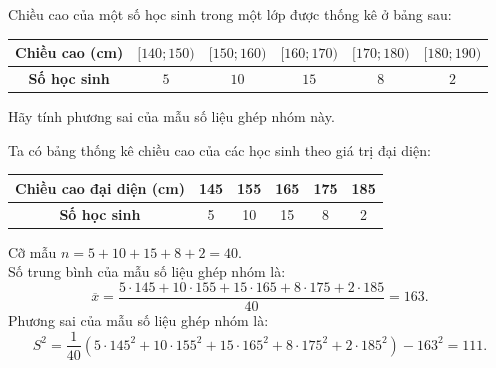 \begin{bt}[Mức độ 2]%
Chiều cao của một số học sinh trong một lớp được thống kê ở bảng sau:
\begin{center}
\begin{tabular}{|c|c|c|c|c|c|}
\hline
\textbf{Chiều cao (cm)} & $[140; 150)$ & $[150; 160)$ & $[160; 170)$ & $[170; 180)$ & $[180; 190)$ \\
\hline
\textbf{Số học sinh} & $5$ & $10$ & $15$ & $8$ & $2$ \\
\hline
\end{tabular}
\end{center}
Hãy tính phương sai của mẫu số liệu ghép nhóm này.
\loigiai
{
Ta có bảng thống kê chiều cao của các học sinh theo giá trị đại diện:
\begin{center}
\begin{tabular}{|c|c|c|c|c|c|}
\hline
\textbf{Chiều cao đại diện (cm)} & 145 & 155 & 165 & 175 & 185 \\
\hline
\textbf{Số học sinh} & 5 & 10 & 15 & 8 & 2 \\
\hline
\end{tabular}
\end{center}
Cỡ mẫu $n=5+10+15+8+2=40$.\\
Số trung bình của mẫu số liệu ghép nhóm là:
\[ \overline{x}=\dfrac{5\cdot 145+10\cdot155+15\cdot165+8\cdot175+2\cdot185}{40}=163. \]
Phương sai của mẫu số liệu ghép nhóm là:
\[ S^2=\dfrac{1}{40}\left(5\cdot145^2+10\cdot 155^2+15\cdot165^2+8\cdot175^2+2\cdot185^2 \right)-163^2=111. \]
}
\end{bt}

